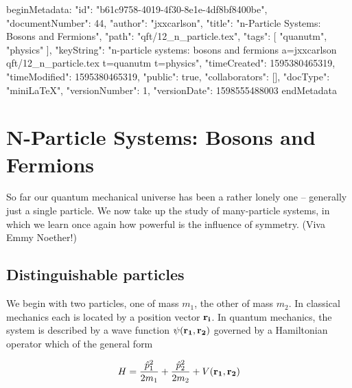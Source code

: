beginMetadata:
{
    "id": "b61c9758-4019-4f30-8e1e-4df8bf8400be",
    "documentNumber": 44,
    "author": "jxxcarlson",
    "title": "n-Particle Systems: Bosons and Fermions",
    "path": "qft/12_n_particle.tex",
    "tags": [
        "quanutm",
        "physics"
    ],
    "keyString": "n-particle systems: bosons and fermions a=jxxcarlson qft/12_n_particle.tex t=quanutm t=physics",
    "timeCreated": 1595380465319,
    "timeModified": 1595380465319,
    "public": true,
    "collaborators": [],
    "docType": "miniLaTeX",
    "versionNumber": 1,
    "versionDate": 1598555488003
}
endMetadata


\begin{mathmacro}
\newcommand{\bra}[0]{\langle}
\newcommand{\ket}[0]{\rangle}
\newcommand{\caF}[0]{\mathcal{F}}
\newcommand{\caA}[0]{\mathcal{A}}
\newcommand{\boR}[0]{\bf{R}}
\newcommand{\bor}[0]{\bf{r}}
\newcommand{\boL}[0]{\bf{L}}
\newcommand{\sett}[2]{\{#1\ |\ #2 \}}
\newcommand{\set}[1]{\{#1\}}

\end{mathmacro}

\setcounter{section}{12}

\section{N-Particle Systems: Bosons and Fermions}

\innertableofcontents

So far our quantum mechanical universe has been a rather lonely one -- generally just a single particle.  We now take up the study of many-particle systems, in which we learn once again how powerful is the influence of symmetry. (Viva Emmy Noether!) 

\subsection{Distinguishable particles}

We begin with two particles, one of mass $m_1$, the other of mass $m_2$.  In classical mechanics each is located by a position vector $\bor_i$.  In quantum mechanics, the system is described by a wave function $\psi(\bor_1, \bor_2)$ governed by a Hamiltonian operator
which of the general form 

\begin{equation}
H = \frac{\hat p_1^2 }{2m_1}
    + \frac{\hat p_2^2 }{2m_2}
 + V(\bor_1, \bor_2)
\end{equation}

